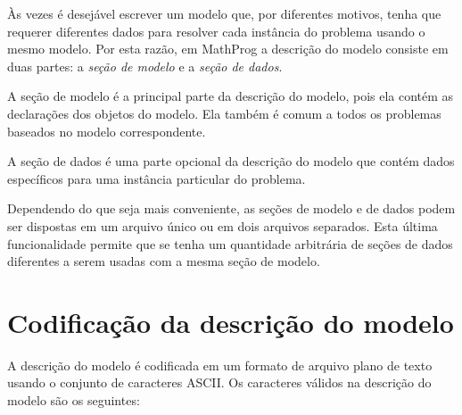 \documentclass[11pt, brazil]{report}
\begin{document}
Às vezes é desejável escrever um modelo que, por diferentes motivos,
tenha que requerer diferentes dados para resolver cada instância do problema
usando o mesmo modelo.
Por esta razão, em MathProg a descrição do modelo consiste em duas partes:
a {\it seção de modelo} e a {\it seção de dados}.


A seção de modelo é a principal parte da descrição do modelo, pois ela contém
as declarações dos objetos do modelo. Ela também é comum  a todos os problemas
baseados no modelo correspondente.


A seção de dados é uma parte opcional da descrição do modelo que
contém dados específicos para uma instância particular do problema.


Dependendo do que seja mais conveniente, as seções de modelo e de dados
podem ser dispostas em um arquivo único ou em dois arquivos separados.
Esta última funcionalidade permite que se tenha um quantidade arbitrária
de seções de dados diferentes a serem usadas com a mesma seção de modelo.



\chapter{Codificação da descrição do modelo}
\label{coding}

A descrição do modelo é codificada em um formato de arquivo plano de
texto usando o conjunto de caracteres ASCII.
Os caracteres válidos na descrição do modelo são os seguintes:
\end{document}
